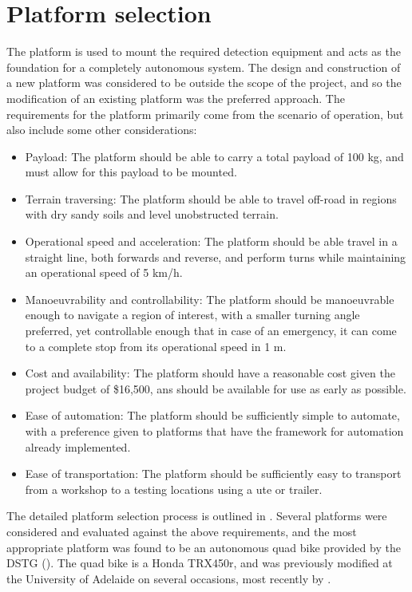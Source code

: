 \documentclass[main.tex]{subfiles}
\begin{document}
\section{Platform selection}
The platform is used to mount the required detection equipment and acts as the foundation for a completely autonomous system. The design and construction of a new platform was considered to be outside the scope of the project, and so the modification of an existing platform was the preferred approach. The requirements for the platform primarily come from the scenario of operation, but also include some other considerations: 

\begin{itemize}
 \item Payload: The platform should be able to carry a total payload of 100 kg, and must allow for this payload to be mounted.
 \item Terrain traversing: The platform should be able to travel off-road in regions with dry sandy soils and level unobstructed terrain.
\item  Operational speed and acceleration: The platform should be able travel in a straight line, both forwards and reverse, and perform turns while maintaining an operational speed of 5 km/h.
\item Manoeuvrability and controllability: The platform should be manoeuvrable enough to navigate a region of interest, with a smaller turning angle preferred, yet controllable enough that in case of an emergency, it can come to a complete stop from its operational speed in 1 m.
\item Cost and availability: The platform should have a reasonable cost given the project budget of \$16,500, ans should be available for use as early as possible. 
\item Ease of automation: The platform should be sufficiently simple to automate, with a preference given to platforms that have the framework for automation already implemented. 
\item Ease of transportation: The platform should be sufficiently easy to transport from a workshop to a testing locations using a ute or trailer.
\end{itemize}

The detailed platform selection process is outlined in . Several platforms were considered and evaluated against the above requirements, and the most appropriate platform was found to be an autonomous quad bike provided by the DSTG (). The quad bike is a Honda TRX450r, and was previously modified at the University of Adelaide on several occasions, most recently by \textcite{scheiner2011}. 
\end{document}
